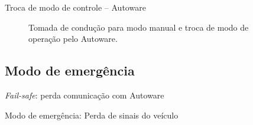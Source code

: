 \documentclass{if-beamer}
\begin{document}
\begin{frame}{Troca de modo de controle -- Autoware}
	
	\begin{figure}[H]
		\centering
		\caption{Tomada de condução para modo manual e troca de modo de operação pelo Autoware.}
		\label{fig:microautoware_testing_autonomous_w_manual_mode_take_up}
	\end{figure}
\end{frame}

\subsection*{Modo de emergência}

\begin{frame}{\textit{Fail-safe}: perda comunicação com Autoware}
	

\end{frame}

\begin{frame}{Modo de emergência: Perda de sinais do veículo}
	

\end{frame}
\end{document}

